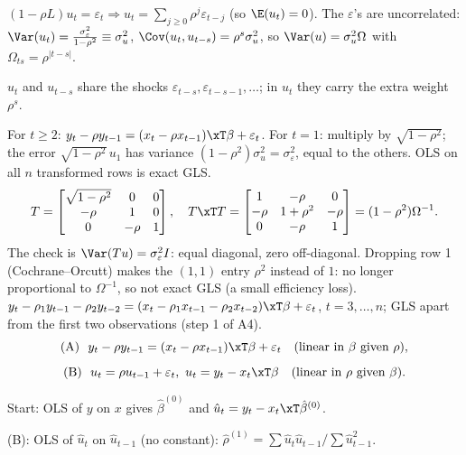 \begin{solbox}
 $(1-\rho L)u_{t}=\varepsilon_{t}\Rightarrow u_{t}=\sum_{j\ge0}\rho^{j}\varepsilon_{t-j}$ (so $\E(u_{t})=0$). The $\varepsilon$'s are uncorrelated:
$\Var(u_{t})=\frac{\sigma_{\varepsilon}^{2}}{1-\rho^{2}}\equiv\sigma_{u}^{2}$, $\Cov(u_{t},u_{t-s})=\rho^{s}\sigma_{u}^{2}$, so
$\Var(u)=\sigma_{u}^{2}\Omega$ with $\Omega_{ts}=\rho^{|t-s|}$.
\begin{why}\Why $u_{t}$ and $u_{t-s}$ share the shocks $\varepsilon_{t-s},\varepsilon_{t-s-1},\dots$; in $u_{t}$ they carry the extra weight $\rho^{s}$.\end{why}
 For $t\ge2$: $y_{t}-\rho y_{t-1}=(x_{t}-\rho x_{t-1})\xT\beta+\varepsilon_{t}$. For $t=1$: multiply by $\sqrt{1-\rho^{2}}$; the error $\sqrt{1-\rho^{2}}\,u_{1}$ has variance
$(1-\rho^{2})\sigma_{u}^{2}=\sigma_{\varepsilon}^{2}$, equal to the others. OLS on all $n$ transformed rows is exact GLS.
\[
  T=\begin{bmatrix}\sqrt{1-\rho^{2}}&0&0\\-\rho&1&0\\0&-\rho&1\end{bmatrix},\quad
  T\xT T=\begin{bmatrix}1&-\rho&0\\-\rho&1+\rho^{2}&-\rho\\0&-\rho&1\end{bmatrix}=(1-\rho^{2})\Omega^{-1}.
\]
The check is $\Var(Tu)=\sigma_{\varepsilon}^{2}I$: equal diagonal, zero off-diagonal. Dropping row 1 (Cochrane--Orcutt) makes the $(1,1)$ entry $\rho^{2}$ instead of $1$: no longer
proportional to $\Omega^{-1}$, so not exact GLS (a small efficiency loss).
 $y_{t}-\rho_{1}y_{t-1}-\rho_{2}y_{t-2}=(x_{t}-\rho_{1}x_{t-1}-\rho_{2}x_{t-2})\xT\beta+\varepsilon_{t}$, $t=3,\dots,n$; GLS apart from the first two observations (step 1 of A4).
\[
  \text{(A)}\ \ y_{t}-\rho y_{t-1}=(x_{t}-\rho x_{t-1})\xT\beta+\varepsilon_{t}\quad(\text{linear in }\beta\text{ given }\rho),
\]
\[
  \text{(B)}\ \ u_{t}=\rho u_{t-1}+\varepsilon_{t},\ u_{t}=y_{t}-x_{t}\xT\beta\quad(\text{linear in }\rho\text{ given }\beta).
\]
\begin{flatnum}
  \item Start: OLS of $y$ on $x$ gives $\hat\beta^{(0)}$ and $\hat u_{t}=y_{t}-x_{t}\xT\hat\beta^{(0)}$.
  \item (B): OLS of $\hat u_{t}$ on $\hat u_{t-1}$ (no constant): $\hat\rho^{(1)}=\sum\hat u_{t}\hat u_{t-1}/\sum\hat u_{t-1}^{2}$.

\end{flatnum}
\end{solbox}
